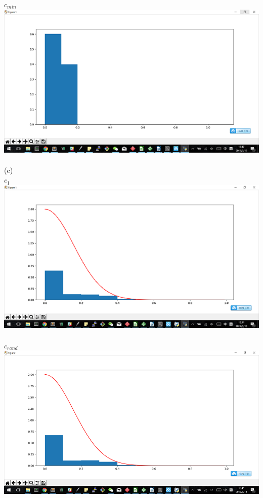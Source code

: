 \documentclass[12pt]{article}
\begin{document}
$c_{min}$\\%
\includegraphics[scale=0.6]{c_min}\\\\
(c)\\
$c_1$\\
\includegraphics[scale=0.6]{c_1_c}\\\\
$c_{rand}$\\
\includegraphics[scale=0.6]{c_rand_c}\\\\
\end{document}
